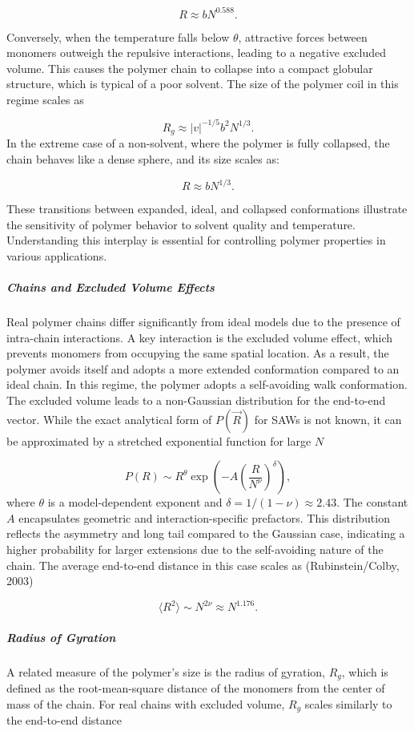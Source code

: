 \documentclass{article}      %
\begin{document}
\[
R \approx b N^{0.588}.
\]

Conversely, when the temperature falls below \( \theta \), attractive forces between monomers outweigh the repulsive interactions, leading to a negative excluded volume. This causes the polymer chain to collapse into a compact globular structure, which is typical of a poor solvent. The size of the polymer coil in this regime scales as

\[
R_g \approx |v|^{-1/5} b^2 N^{1/3}.
\]
In the extreme case of a non-solvent, where the polymer is fully collapsed, the chain behaves like a dense sphere, and its size scales as:

\[
R \approx b N^{1/3}.
\]

These transitions between expanded, ideal, and collapsed conformations illustrate the sensitivity of polymer behavior to solvent quality and temperature. Understanding this interplay is essential for controlling polymer properties in various applications.

\subparagraph{Chains and Excluded Volume Effects}
Real polymer chains differ significantly from ideal models due to the presence of intra-chain interactions. A key interaction is the excluded volume effect, which prevents monomers from occupying the same spatial location. As a result, the polymer avoids itself and adopts a more extended conformation compared to an ideal chain.
In this regime, the polymer adopts a self-avoiding walk conformation. The excluded volume leads to a non-Gaussian distribution for the end-to-end vector. While the exact analytical form of \( P(\vec{R}) \) for SAWs is not known, it can be approximated by a stretched exponential function for large \( N \)

\[
P(R) \sim R^{\theta} \exp\left( -A \left( \frac{R}{N^\nu} \right)^\delta \right),
\]
where \( \theta \) is a model-dependent exponent and  \( \delta = 1/(1 - \nu) \approx 2.43 \). The constant \( A \) encapsulates geometric and interaction-specific prefactors. This distribution reflects the asymmetry and long tail compared to the Gaussian case, indicating a higher probability for larger extensions due to the self-avoiding nature of the chain.
The average end-to-end distance in this case scales as (Rubinstein/Colby, 2003)

\[
\langle R^2 \rangle \sim N^{2\nu} \approx N^{1.176}.
\]


\subparagraph{Radius of Gyration}

A related measure of the polymer's size is the radius of gyration, \( R_g \), which is defined as the root-mean-square distance of the monomers from the center of mass of the chain. For real chains with excluded volume, \( R_g \) scales similarly to the end-to-end distance
\end{document}
